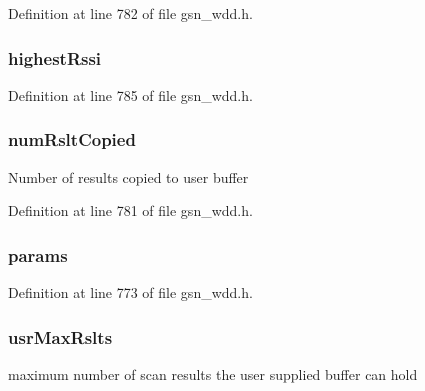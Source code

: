 Definition at line 782 of file gsn\_\-wdd.h.

\hypertarget{a00285_aa95268660e3c7ea1fe1db793de8f7c65}{
\subsubsection[{highestRssi}]{ {\bf highestRssi}}}
\label{a00285_aa95268660e3c7ea1fe1db793de8f7c65}


Definition at line 785 of file gsn\_\-wdd.h.

\hypertarget{a00285_a44f66633bd87382694e27ab600f55cc7}{
\subsubsection[{numRsltCopied}]{ {\bf numRsltCopied}}}
\label{a00285_a44f66633bd87382694e27ab600f55cc7}
Number of results copied to user buffer 

Definition at line 781 of file gsn\_\-wdd.h.

\hypertarget{a00285_a3c0efac3a2550ab707a57c7d726ad51c}{
\subsubsection[{params}]{ {\bf params}}}
\label{a00285_a3c0efac3a2550ab707a57c7d726ad51c}


Definition at line 773 of file gsn\_\-wdd.h.

\hypertarget{a00285_a936453de45ac760367aa353fe0302dfa}{
\subsubsection[{usrMaxRslts}]{ {\bf usrMaxRslts}}}
\label{a00285_a936453de45ac760367aa353fe0302dfa}
maximum number of scan results the user supplied buffer can hold 

